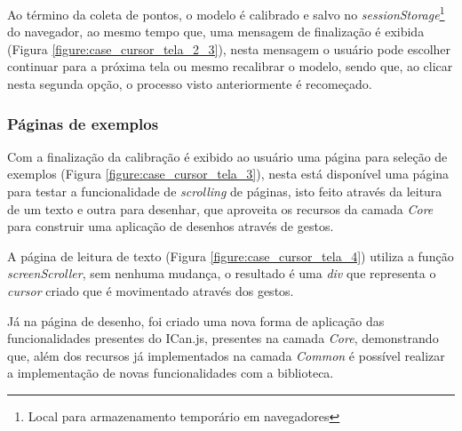 \par Ao término da coleta de pontos, o modelo é calibrado e salvo no \textit{sessionStorage}\footnote{Local para armazenamento temporário em navegadores} do navegador, ao mesmo tempo que, uma mensagem de finalização é exibida (Figura \ref{figure:case_cursor_tela_2_3}), nesta mensagem o usuário pode escolher continuar para a próxima tela ou mesmo recalibrar o modelo, sendo que, ao clicar nesta segunda opção, o processo visto anteriormente é recomeçado.


\subsubsection{Páginas de exemplos}

\par Com a finalização da calibração é exibido ao usuário uma página para seleção de exemplos (Figura \ref{figure:case_cursor_tela_3}), nesta está disponível uma página para testar a funcionalidade de \textit{scrolling} de páginas, isto feito através da leitura de um texto e outra para desenhar, que aproveita os recursos da camada \textit{Core} para construir uma aplicação de desenhos através de gestos.


\par A página de leitura de texto (Figura \ref{figure:case_cursor_tela_4}) utiliza a função \textit{screenScroller}, sem nenhuma mudança, o resultado é uma \textit{div} que representa o \textit{cursor} criado que é movimentado através dos gestos.


\par Já na página de desenho, foi criado uma nova forma de aplicação das funcionalidades presentes do ICan.js, presentes na camada \textit{Core}, demonstrando que, além dos recursos já implementados na camada \textit{Common} é possível realizar a implementação de novas funcionalidades com a biblioteca.

